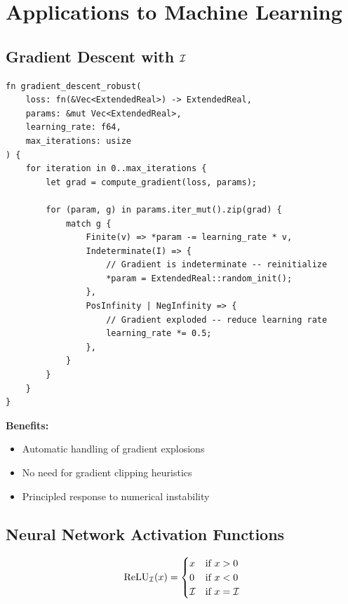 \section{Applications to Machine Learning}

\subsection{Gradient Descent with $\mathcal{I}$}

\begin{algorithm}
\begin{verbatim}
fn gradient_descent_robust(
    loss: fn(&Vec<ExtendedReal>) -> ExtendedReal,
    params: &mut Vec<ExtendedReal>,
    learning_rate: f64,
    max_iterations: usize
) {
    for iteration in 0..max_iterations {
        let grad = compute_gradient(loss, params);
        
        for (param, g) in params.iter_mut().zip(grad) {
            match g {
                Finite(v) => *param -= learning_rate * v,
                Indeterminate(I) => {
                    // Gradient is indeterminate -- reinitialize
                    *param = ExtendedReal::random_init();
                },
                PosInfinity | NegInfinity => {
                    // Gradient exploded -- reduce learning rate
                    learning_rate *= 0.5;
                },
            }
        }
    }
}
\end{verbatim}
\end{algorithm}

\textbf{Benefits:}
\begin{itemize}
    \item Automatic handling of gradient explosions
    \item No need for gradient clipping heuristics
    \item Principled response to numerical instability
\end{itemize}

\subsection{Neural Network Activation Functions}

\begin{definition}
\[
\text{ReLU}_{\mathcal{I}}(x) = \begin{cases}
x & \text{if } x > 0 \\
0 & \text{if } x < 0 \\
\mathcal{I} & \text{if } x = \mathcal{I}
\end{cases}
\]
\end{definition}

